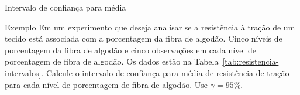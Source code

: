\documentclass[8pt]{beamer}
\begin{document}
\begin{frame}{Intervalo de confiança para média}

\begin{block}{Exemplo}
	Em um experimento que deseja analisar se a resistência à tração de um tecido está associada com a porcentagem da fibra de algodão. Cinco níveis de porcentagem da fibra de algodão e cinco observações em cada nível de porcentagem de fibra de algodão. Os dados estão na Tabela~\ref{tab:resistencia-intervalos}. Calcule o intervalo de confiança para média de resistência de tração para cada nível de porcentagem de fibra de algodão. Use $\gamma = 95\%$. 
	\begin{table}[ht]
		\centering
		\caption{Resistência à tração} 
		\label{tab:resistencia-intervalos}
	\end{table}
\end{block}

\end{frame}
\end{document}
